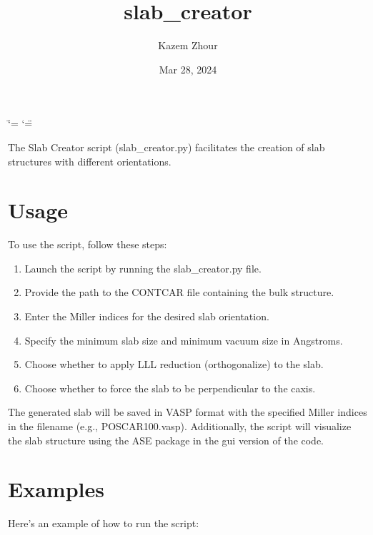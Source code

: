 \documentclass[letterpaper,10pt,english]{sphinxmanual}
\title{slab\_creator}
\date{Mar 28, 2024}
\author{Kazem Zhour}
\begin{document}
\ifdefined\shorthandoff
  \ifnum\catcode`\=\string=\active\shorthandoff{=}\fi
  \ifnum\catcode`\"=\active{}\fi
\fi

\pagestyle{empty}
\sphinxmaketitle
\pagestyle{plain}
\sphinxtableofcontents
\pagestyle{normal}
\label{\detokenize{index::doc}}


\sphinxAtStartPar
The Slab Creator script (slab\_creator.py) facilitates the creation of slab structures with different orientations.

\sphinxstepscope


\chapter{Usage}
\label{\detokenize{usage:usage}}\label{\detokenize{usage::doc}}
\sphinxAtStartPar
To use the script, follow these steps:
\begin{enumerate}
%
\item {} 
\sphinxAtStartPar
Launch the script by running the slab\_creator.py file.

\item {} 
\sphinxAtStartPar
Provide the path to the CONTCAR file containing the bulk structure.

\item {} 
\sphinxAtStartPar
Enter the Miller indices for the desired slab orientation.

\item {} 
\sphinxAtStartPar
Specify the minimum slab size and minimum vacuum size in Angstroms.

\item {} 
\sphinxAtStartPar
Choose whether to apply LLL reduction (orthogonalize) to the slab.

\item {} 
\sphinxAtStartPar
Choose whether to force the slab to be perpendicular to the c\sphinxhyphen{}axis.

\end{enumerate}

\sphinxAtStartPar
The generated slab will be saved in VASP format with the specified Miller indices in the filename (e.g., POSCAR100.vasp). Additionally, the script will visualize the slab structure using the ASE package in the gui version of the code.

\sphinxstepscope


\chapter{Examples}
\label{\detokenize{examples:examples}}\label{\detokenize{examples::doc}}
\sphinxAtStartPar
Here’s an example of how to run the script:
\end{document}
